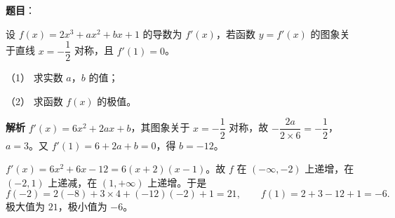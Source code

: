 \begin{answer}

\textbf{题目}：

设 $f(x)=2x^3+ax^2+bx+1$ 的导数为 $f'(x)$，若函数 $y=f'(x)$ 的图象关于直线 $x=-\dfrac12$ 对称，且 $f'(1)=0$。

（1） 求实数 $a$，$b$ 的值；

（2） 求函数 $f(x)$ 的极值。

\textbf{解析}
$f'(x)=6x^2+2ax+b$，其图象关于 $x=-\dfrac12$ 对称，故 $-\dfrac{2a}{2\times6}=-\dfrac12$，$a=3$。又 $f'(1)=6+2a+b=0$，得 $b=-12$。

$f'(x)=6x^2+6x-12=6(x+2)(x-1)$。故 $f$ 在 $(-\infty,-2)$ 上递增，在 $(-2,1)$ 上递减，在 $(1,+\infty)$ 上递增。于是
\nopagebreak[4]
\[f(-2)=2(-8)+3\times4+(-12)(-2)+1=21,\qquad f(1)=2+3-12+1=-6.\]
极大值为 $21$，极小值为 $-6$。



\end{answer}
